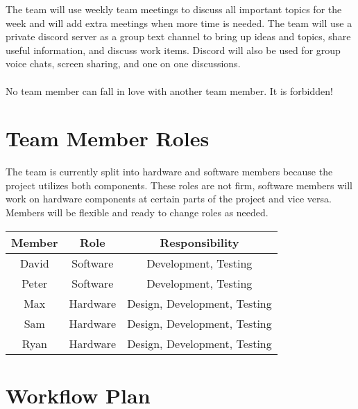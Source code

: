 \documentclass{article}
\begin{document}
The team will use weekly team meetings to discuss all important topics for the week and will add extra meetings when more time is needed. The team will use a private discord server as a group text channel to bring up ideas and topics, share useful information, and discuss work items. Discord will also be used for group voice chats, screen sharing, and one on one discussions. \\\\
No team member can fall in love with another team member. It is forbidden!

\section{Team Member Roles}

The team is currently split into hardware and software members because the project utilizes both components. These roles are not firm, software members will work on hardware components at certain parts of the project and vice versa. Members will be flexible and ready to change roles as needed.

\begin{center}
\begin{tabular}{ | c | c | c | }
\hline
 Member & Role & Responsibility \\ 
 \hline
 David & Software & Development, Testing \\  
 Peter & Software & Development, Testing \\  
 \hline
 Max & Hardware & Design, Development, Testing \\  
 Sam & Hardware & Design, Development, Testing \\  
 Ryan & Hardware & Design, Development, Testing \\  
 \hline
\end{tabular}
\end{center}

\section{Workflow Plan}
\end{document}
